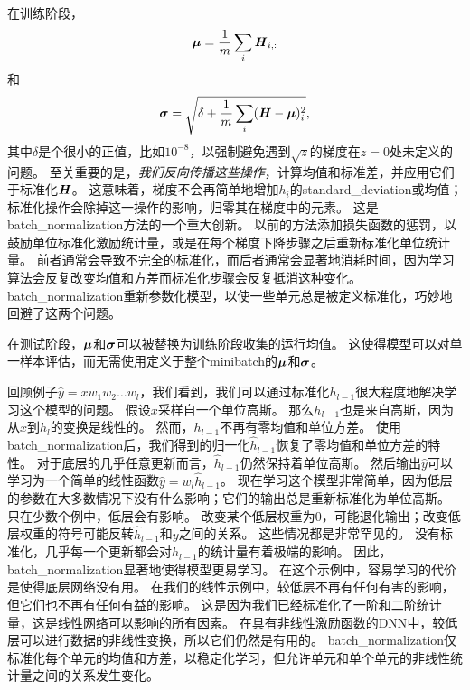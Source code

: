在训练阶段，
\begin{equation}
    \boldsymbol{\mu} = \frac{1}{m} \sum_i \boldsymbol{\mathit{H}}_{i,:}
\end{equation}
和
\begin{equation}
    \boldsymbol{\sigma} = \sqrt{ \delta + \frac{1}{m} \sum_i (\boldsymbol{\mathit{H}} - \boldsymbol{\mu})_i^2 },
\end{equation}
其中$\delta$是个很小的正值，比如$10^{-8}$，以强制避免遇到$\sqrt{z}$的梯度在$z=0$处未定义的问题。
至关重要的是，\emph{我们反向传播这些操作}，计算均值和标准差，并应用它们于标准化$\boldsymbol{\mathit{H}}$。
这意味着，梯度不会再简单地增加$h_i$的\gls{standard_deviation}或均值；标准化操作会除掉这一操作的影响，归零其在梯度中的元素。
这是\gls{batch_normalization}方法的一个重大创新。
以前的方法添加损失函数的惩罚，以鼓励单位标准化激励统计量，或是在每个梯度下降步骤之后重新标准化单位统计量。
前者通常会导致不完全的标准化，而后者通常会显著地消耗时间，因为学习算法会反复改变均值和方差而标准化步骤会反复抵消这种变化。
\gls{batch_normalization}重新参数化模型，以使一些单元总是被定义标准化，巧妙地回避了这两个问题。


在测试阶段，$\boldsymbol{\mu}$和$\boldsymbol{\sigma}$可以被替换为训练阶段收集的运行均值。
这使得模型可以对单一样本评估，而无需使用定义于整个\gls{minibatch}的$\boldsymbol{\mu}$和$\boldsymbol{\sigma}$。

回顾例子$\hat{y} = x w_1 w_2 \dots w_l$，我们看到，我们可以通过标准化$h_{l-1}$很大程度地解决学习这个模型的问题。
假设$x$采样自一个单位高斯。
那么$h_{l-1}$也是来自高斯，因为从$x$到$h_l$的变换是线性的。
然而，$h_{l-1}$不再有零均值和单位方差。
使用\gls{batch_normalization}后，我们得到的归一化$\hat{h}_{l-1}$恢复了零均值和单位方差的特性。
对于底层的几乎任意更新而言，$\hat{h}_{l-1}$仍然保持着单位高斯。
然后输出$\hat{y}$可以学习为一个简单的线性函数$\hat{y} = w_l \hat{h}_{l-1}$。
现在学习这个模型非常简单，因为低层的参数在大多数情况下没有什么影响；它们的输出总是重新标准化为单位高斯。
只在少数个例中，低层会有影响。
改变某个低层权重为$0$，可能退化输出；改变低层权重的符号可能反转$\hat{h}_{l-1}$和$y$之间的关系。
这些情况都是非常罕见的。
没有标准化，几乎每一个更新都会对$h_{l-1}$的统计量有着极端的影响。
因此，\gls{batch_normalization}显著地使得模型更易学习。
在这个示例中，容易学习的代价是使得底层网络没有用。
在我们的线性示例中，较低层不再有任何有害的影响，但它们也不再有任何有益的影响。
这是因为我们已经标准化了一阶和二阶统计量，这是线性网络可以影响的所有因素。
在具有非线性激励函数的\gls{DNN}中，较低层可以进行数据的非线性变换，所以它们仍然是有用的。
\gls{batch_normalization}仅标准化每个单元的均值和方差，以稳定化学习，但允许单元和单个单元的非线性统计量之间的关系发生变化。

